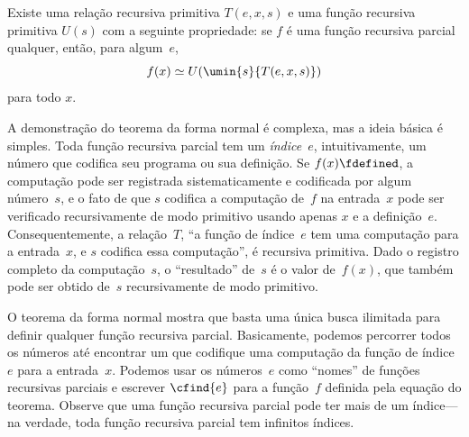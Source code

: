 \documentclass[../../../include/open-logic-section]{subfiles}
\begin{document}

\begin{thm}
Existe uma relação recursiva primitiva $T(e, x, s)$ e uma função
recursiva primitiva $U(s)$ com a seguinte propriedade: se $f$ é uma
função recursiva parcial qualquer, então, para algum~$e$,
\[
f(x) \simeq U(\umin{s}{T(e, x, s)})
\]
para todo $x$.
\end{thm}

\begin{explain}
A demonstração do teorema da forma normal é complexa, mas a ideia
básica é simples. Toda função recursiva parcial tem um \emph{índice}~$e$,
intuitivamente, um número que codifica seu programa ou sua definição.
Se $f(x) \fdefined$, a computação pode ser registrada sistematicamente
e codificada por algum número~$s$, e o fato de que $s$ codifica a
computação de~$f$ na entrada~$x$ pode ser verificado recursivamente de
modo primitivo usando apenas $x$ e a definição~$e$. Consequentemente,
a relação~$T$, ``a função de índice~$e$ tem uma computação para a
entrada~$x$, e $s$ codifica essa computação'', é recursiva primitiva.
Dado o registro completo da computação~$s$, o ``resultado'' de~$s$ é
o valor de~$f(x)$, que também pode ser obtido de~$s$ recursivamente de
modo primitivo.

O teorema da forma normal mostra que basta uma única busca ilimitada
para definir qualquer função recursiva parcial. Basicamente, podemos
percorrer todos os números até encontrar um que codifique uma computação
da função de índice~$e$ para a entrada~$x$. Podemos usar os números~$e$
como ``nomes'' de funções recursivas parciais e escrever $\cfind{e}$
para a função~$f$ definida pela equação do teorema. Observe que uma
função recursiva parcial pode ter mais de um índice---na verdade, toda
função recursiva parcial tem infinitos índices.
\end{explain}
\end{document}
